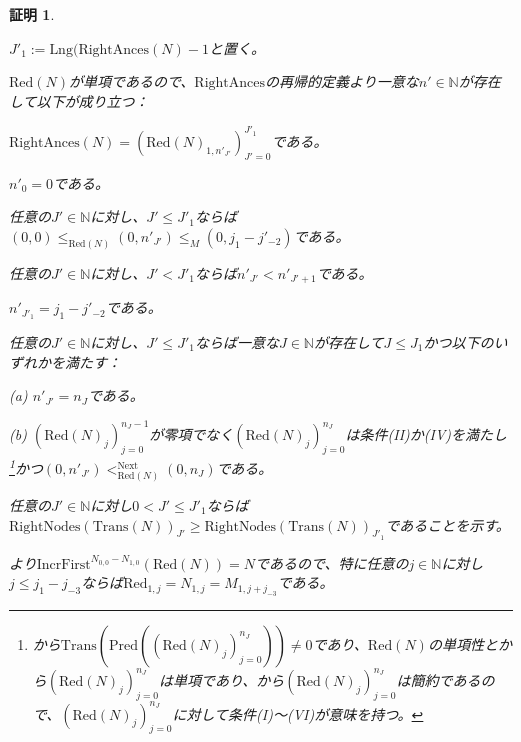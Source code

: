 \documentclass[dvipdfmx,uplatex]{jsarticle}
\theoremstyle{customnonumberbreakfortheorem}
\theoremstyle{customnonumberbreakforproof}
\newtheorem{hideableproof}{証明}
\begin{document}
\begin{hideableproof}
\begin{indented}
		\item \(J'_1 := \textrm{Lng}(\textrm{RightAnces}(N)-1\)と置く。
		\item \(\textrm{Red}(N)\)が単項であるので、\(\textrm{RightAnces}\)の再帰的定義より一意な\(n' \in \mathbb{N}\)が存在して以下が成り立つ：
		\begin{indented}
			\item \(\textrm{RightAnces}(N) = (\textrm{Red}(N)_{1,n'_{J'}})_{J'=0}^{J'_1}\)である。
			\item \(n'_0 = 0\)である。
			\item 任意の\(J' \in \mathbb{N}\)に対し、\(J' \leq J'_1\)ならば\((0,0) \leq_{\textrm{Red}(N)} (0,n'_{J'}) \leq_M (0,j_1-j'_{-2})\)である。
			\item 任意の\(J' \in \mathbb{N}\)に対し、\(J' < J'_1\)ならば\(n'_{J'} < n'_{J'+1}\)である。
			\item \(n'_{J'_1} = j_1-j'_{-2}\)である。
			\item 任意の\(J' \in \mathbb{N}\)に対し、\(J' \leq J'_1\)ならば一意な\(J \in \mathbb{N}\)が存在して\(J \leq J_1\)かつ以下のいずれかを満たす：
			\begin{indented}
				\item[(a)] \(n'_{J'} = n_J\)である。
				\item[(b)] \((\textrm{Red}(N)_j)_{j=0}^{n_J-1}\)が零項でなく\((\textrm{Red}(N)_j)_{j=0}^{n_J}\)は条件(II)か(IV)を満たし\footnote{から\(\textrm{Trans}(\textrm{Pred}((\textrm{Red}(N)_j)_{j=0}^{n_J})) \neq 0\)であり、\(\textrm{Red}(N)\)の単項性とから\((\textrm{Red}(N)_j)_{j=0}^{n_J}\)は単項であり、から\((\textrm{Red}(N)_j)_{j=0}^{n_J}\)は簡約であるので、\((\textrm{Red}(N)_j)_{j=0}^{n_J}\)に対して条件(I)～(VI)が意味を持つ。}かつ\((0,n'_{J'}) <_{\textrm{Red}(N)}^{\textrm{Next}} (0,n_J)\)である。
			\end{indented}
		\end{indented}
		\item
		\item 任意の\(J' \in \mathbb{N}\)に対し\(0 < J' \leq J'_1\)ならば\(\textrm{RightNodes}(\textrm{Trans}(N))_{J'} \geq \textrm{RightNodes}(\textrm{Trans}(N))_{J'_1}\)であることを示す。
		\begin{indented}
			\item {}より\(\textrm{IncrFirst}^{N_{0,0}-N_{1,0}}(\textrm{Red}(N)) = N\)であるので、特に任意の\(j \in \mathbb{N}\)に対し\(j \leq j_1-j_{-3}\)ならば\(\textrm{Red}_{1,j} = N_{1,j} = M_{1,j+j_{-3}}\)である。

\end{indented}
\end{indented}
\end{hideableproof}
\end{document}
